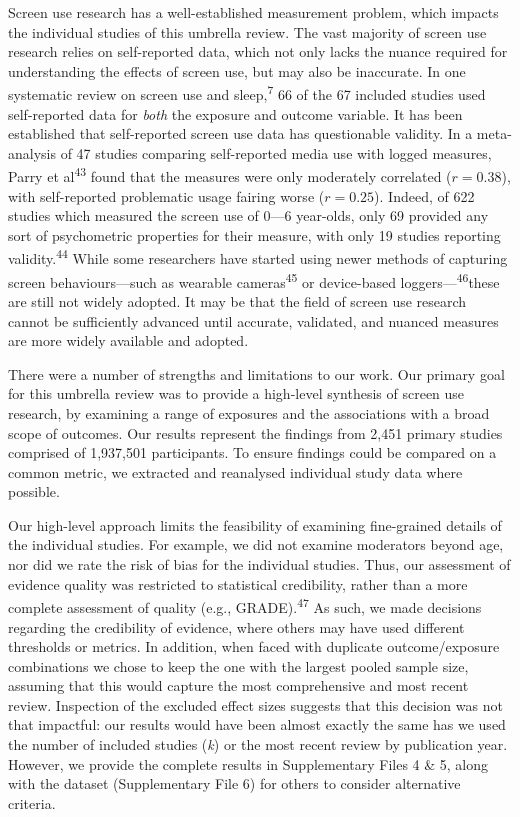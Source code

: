 \documentclass[
  english,
  man]{apa6}
\begin{document}
Screen use research has a well-established measurement problem, which impacts the individual studies of this umbrella review.
The vast majority of screen use research relies on self-reported data, which not only lacks the nuance required for understanding the effects of screen use, but may also be inaccurate.
In one systematic review on screen use and sleep,\textsuperscript{7} 66 of the 67 included studies used self-reported data for \emph{both} the exposure and outcome variable.
It has been established that self-reported screen use data has questionable validity.
In a meta-analysis of 47 studies comparing self-reported media use with logged measures, Parry et al\textsuperscript{43} found that the measures were only moderately correlated (\(r = 0.38\)), with self-reported problematic usage fairing worse (\(r = 0.25\)).
Indeed, of 622 studies which measured the screen use of 0---6 year-olds, only 69 provided any sort of psychometric properties for their measure, with only 19 studies reporting validity.\textsuperscript{44}
While some researchers have started using newer methods of capturing screen behaviours---such as wearable cameras\textsuperscript{45} or device-based loggers---\textsuperscript{46}these are still not widely adopted.
It may be that the field of screen use research cannot be sufficiently advanced until accurate, validated, and nuanced measures are more widely available and adopted.

There were a number of strengths and limitations to our work.
Our primary goal for this umbrella review was to provide a high-level synthesis of screen use research, by examining a range of exposures and the associations with a broad scope of outcomes.
Our results represent the findings from 2,451 primary studies comprised of 1,937,501 participants.
To ensure findings could be compared on a common metric, we extracted and reanalysed individual study data where possible.

Our high-level approach limits the feasibility of examining fine-grained details of the individual studies.
For example, we did not examine moderators beyond age, nor did we rate the risk of bias for the individual studies.
Thus, our assessment of evidence quality was restricted to statistical credibility, rather than a more complete assessment of quality (e.g., GRADE).\textsuperscript{47}
As such, we made decisions regarding the credibility of evidence, where others may have used different thresholds or metrics.
In addition, when faced with duplicate outcome/exposure combinations we chose to keep the one with the largest pooled sample size, assuming that this would capture the most comprehensive and most recent review.
Inspection of the excluded effect sizes suggests that this decision was not that impactful: our results would have been almost exactly the same has we used the number of included studies (\emph{k}) or the most recent review by publication year.
However, we provide the complete results in Supplementary Files 4 \& 5, along with the dataset (Supplementary File 6) for others to consider alternative criteria.
\end{document}
